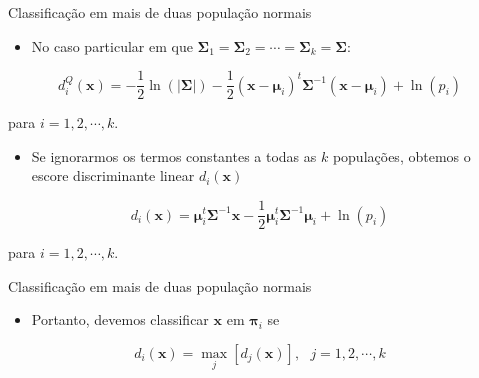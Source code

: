 \documentclass[
  ignorenonframetext,
  aspectratio=169,
]{beamer}
\providecommand{\tightlist}{%
  \setlength{\itemsep}{0pt}\setlength{\parskip}{0pt}}
\begin{document}
\begin{frame}{Classificação em mais de duas população normais}
\label{classificauxe7uxe3o-em-mais-de-duas-populauxe7uxe3o-normais-5}
\begin{itemize}
\tightlist
\item
  No caso particular em que
  \(\boldsymbol{\Sigma}_1 = \boldsymbol{\Sigma}_2 = \cdots = \boldsymbol{\Sigma}_k = \boldsymbol{\Sigma}\):
\end{itemize}

\[
d_i^Q(\boldsymbol{x}) =  - \dfrac{1}{2} \ln \left( |\boldsymbol{\Sigma}|\right) - \dfrac{1}{2} \left( \boldsymbol{x} - \boldsymbol{\mu}_i\right) ^t \boldsymbol{\Sigma}^{-1} \left( \boldsymbol{x} - \boldsymbol{\mu}_i\right) + \ln\left( p_i\right) 
\]

para \(i = 1, 2, \cdots, k\).

\pause

\begin{itemize}
\tightlist
\item
  Se ignorarmos os termos constantes a todas as \(k\) populações,
  obtemos o escore discriminante linear \(d_i(\boldsymbol{x})\)
\end{itemize}

\[
d_i(\boldsymbol{x}) =  \boldsymbol{\mu}_i^t \boldsymbol{\Sigma}^{-1} \boldsymbol{x} - \dfrac{1}{2} \boldsymbol{\mu}_i^t \boldsymbol{\Sigma}^{-1} \boldsymbol{\mu}_i + \ln\left( p_i\right) 
\]

para \(i = 1, 2, \cdots, k\).
\end{frame}

\begin{frame}{Classificação em mais de duas população normais}
\label{classificauxe7uxe3o-em-mais-de-duas-populauxe7uxe3o-normais-6}
\begin{itemize}
\tightlist
\item
  Portanto, devemos classificar \(\boldsymbol{x}\) em
  \(\boldsymbol{\pi}_i\) se
\end{itemize}

\[d_i(\boldsymbol{x}) = \max_j \left[d_j(\boldsymbol{x})\right], \,\,\,\, j = 1, 2, \cdots, k\]
\end{frame}
\end{document}

